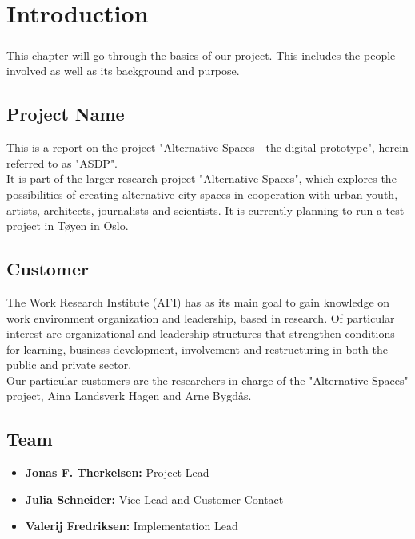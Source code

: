 \chapter{Introduction}

\paragraph{} This chapter will go through the basics of our project. This includes the people involved as well as its background and purpose.

\section{Project Name} 
This is a report on the project "Alternative Spaces - the digital prototype", herein referred to as "ASDP".\\
\indent It is part of the larger research project "Alternative Spaces", which explores the possibilities of creating alternative city spaces in cooperation with urban youth, artists, architects, journalists and scientists. It is currently planning to run a test project in T\o yen in Oslo.

\section{Customer}
The Work Research Institute (AFI) has as its main goal to gain knowledge on work environment organization and leadership, based in research. Of particular interest are organizational and leadership structures that strengthen conditions for learning, business development, involvement and restructuring in both the public and private sector.\\
\indent Our particular customers are the researchers in charge of the "Alternative Spaces" project, Aina Landsverk Hagen and Arne Bygd\aa s.

\section{Team}
\begin{itemize}
\item \textbf{Jonas F. Therkelsen:} Project Lead
\item \textbf{Julia Schneider:} Vice Lead and Customer Contact
\item \textbf{Valerij Fredriksen:} Implementation Lead
\end{itemize}

